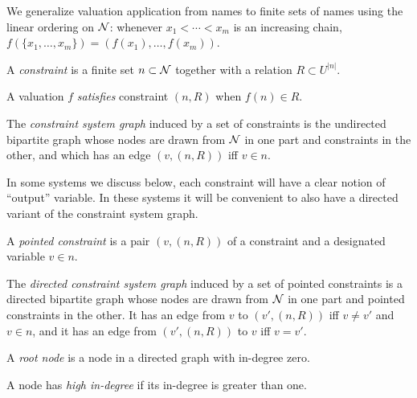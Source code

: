We generalize valuation application from names to finite sets of names using
the linear ordering on $\mathcal N$: whenever $x_1 < \cdots < x_m$ is an
increasing chain, $f(\{x_1,\ldots,x_m\}) = (f(x_1),\ldots,f(x_m))$.

\begin{definition}
    A \emph{constraint} is a finite set $n \subset \mathcal N$ together with a
    relation $R \subset U^{|n|}$.
\end{definition}

\begin{definition}
    A valuation $f$ \emph{satisfies} constraint $(n,R)$ when $f(n) \in R$.
\end{definition}

\begin{definition}
    The \emph{constraint system graph} induced by a set of constraints is
    the undirected bipartite graph whose nodes are drawn from $\mathcal N$ in
    one part and constraints in the other, and which has an edge $(v,(n,R))$
    iff $v \in n$.
\end{definition}

In some systems we discuss below, each constraint will have a clear notion
of ``output'' variable. In these systems it will be convenient to also have
a directed variant of the constraint system graph.

\begin{definition}
    A \emph{pointed constraint} is a pair $(v,(n,R))$ of a constraint and a
    designated variable $v\in n$.
\end{definition}

\begin{definition}
    The \emph{directed constraint system graph} induced by a set of pointed
    constraints is a directed bipartite graph whose nodes are drawn from
    $\mathcal N$ in one part and pointed constraints in the other. It has an
    edge from $v$ to $(v',(n,R))$ iff $v \ne v'$ and $v \in n$, and it has
    an edge from $(v',(n,R))$ to $v$ iff $v=v'$.
\end{definition}

\begin{definition}
    A \emph{root node} is a node in a directed graph with in-degree zero.
\end{definition}

\begin{definition}
    A node has \emph{high in-degree} if its in-degree is greater than one.
\end{definition}


